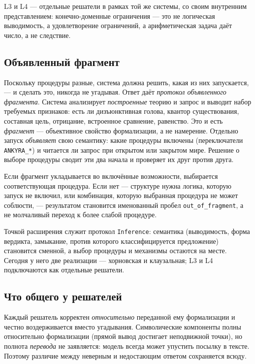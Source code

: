 \documentclass[11pt,a4paper]{article}
\begin{document}
L3 и L4 — отдельные решатели в рамках той же системы, со своим внутренним представлением: конечно-доменные ограничения — это не логическая
выводимость, а удовлетворение ограничений, а арифметическая задача даёт число, а не следствие.

\subsection{Объявленный фрагмент}

Поскольку процедуры разные, система должна решить, какая из них запускается, — и сделать это, никогда не угадывая. Ответ даёт
\emph{протокол объявленного фрагмента}. Система анализирует \emph{построенные} теорию и запрос и выводит набор требуемых
признаков: есть ли дизъюнктивная голова, квантор существования, составная цель, отрицание, встроенное сравнение, равенство.
Это и есть \emph{фрагмент} — объективное свойство формализации, а не намерение. Отдельно запуск \emph{объявляет} свою семантику:
какие процедуры включены (переключатели \texttt{ANKYRA\_*}) и читается ли запрос при открытом или закрытом мире. Решение о
выборе процедуры сводит эти два начала и проверяет их друг против друга.

Если фрагмент укладывается во включённые возможности, выбирается соответствующая процедура. Если нет — структуре нужна логика,
которую запуск не включил, или комбинация, которую выбранная процедура не может соблюсти, — результатом становится именованный
пробел \texttt{out\_of\_fragment}, а не молчаливый переход к более слабой процедуре.

Точкой расширения служит протокол \texttt{Inference}: семантика (выводимость, форма вердикта, замыкание, против которого
классифицируется предложение) становится сменной, а выбор процедуры и механизмы остаются на месте. Сегодня у него две
реализации — хорновская и клаузальная; L3 и L4 подключаются как отдельные решатели.

\subsection{Что общего у решателей}

Каждый решатель корректен \emph{относительно} переданной ему формализации и честно воздерживается вместо угадывания.
Символические компоненты полны относительно формализации (прямой вывод достигает неподвижной точки), но полнота \emph{перевода}
не заявляется: модель всегда может упустить посылку в тексте. Поэтому различие между неверным и недостающим ответом сохраняется всюду.
\end{document}
